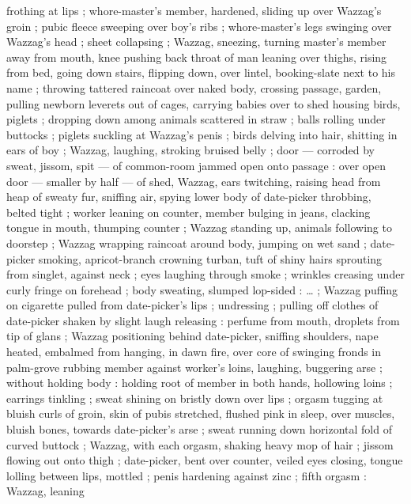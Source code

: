 frothing at lips ; whore-master's member, hardened, sliding up over Wazzag's groin ; pubic fleece
sweeping over boy's ribs ; whore-master's legs swinging over Wazzag's head ; sheet collapsing ;
Wazzag, sneezing, turning master's member away from mouth, knee pushing back throat of man leaning
over thighs, rising from bed, going down stairs, flipping down, over lintel, booking-slate next to
his name ; throwing tattered raincoat over naked body, crossing passage, garden, pulling newborn
leverets out of cages, carrying babies over to shed housing birds, piglets ; dropping down among
animals scattered in straw ; balls rolling under buttocks ; piglets suckling at Wazzag's penis ;
birds delving into hair, shitting in ears of boy ; Wazzag, laughing, stroking bruised belly ; door
--- corroded by sweat, jissom, spit --- of common-room jammed open onto passage : over open door ---
smaller by half --- of shed, Wazzag, ears twitching, raising head from heap of sweaty fur, sniffing
air, spying lower body of date-picker throbbing, belted tight ; worker leaning on counter, member
bulging in jeans, clacking tongue in mouth, thumping counter ; Wazzag standing up, animals following
to doorstep ; Wazzag wrapping raincoat around body, jumping on wet sand ; date-picker smoking,
apricot-branch crowning turban, tuft of shiny hairs sprouting from singlet, against neck ; eyes
laughing through smoke ; wrinkles creasing under curly fringe on forehead ; body sweating, slumped %
lop-sided : {\ldots} ; Wazzag puffing on cigarette pulled from
date-picker's lips ; undressing ; pulling off clothes of date-picker shaken by slight laugh
releasing : perfume from mouth, droplets from tip of glans ; Wazzag positioning behind date-picker,
sniffing shoulders, nape{\comdash} heated, embalmed from hanging, in dawn fire, over core of
swinging fronds in palm-grove {\dashcom} rubbing member against worker's loins, laughing, buggering
arse ; without holding body : holding root of member in both hands, hollowing loins ; earrings
tinkling ; sweat shining on bristly down over lips ; orgasm tugging at bluish curls of groin, skin
of pubis stretched, flushed pink in sleep, over muscles, bluish bones, towards date-picker's arse ;
sweat running down horizontal fold of curved buttock ; Wazzag, with each orgasm, shaking heavy mop
of hair ; jissom flowing out onto thigh ; date-picker, bent over counter, veiled eyes closing,
tongue lolling between lips, mottled ; penis hardening against zinc ; fifth orgasm : Wazzag, leaning
